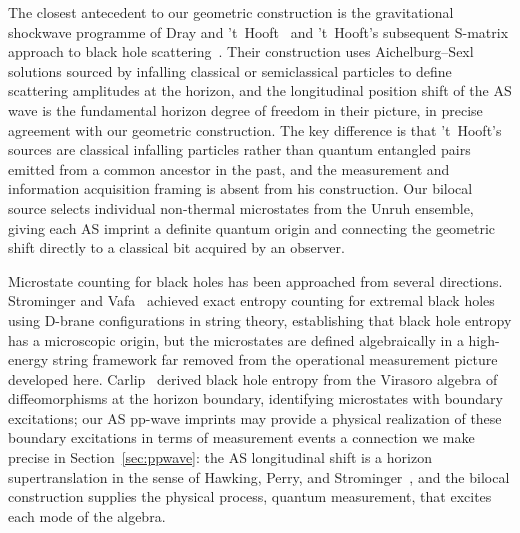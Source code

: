 \documentclass[12pt,a4paper]{article}
\begin{document}

The closest antecedent to our geometric construction is the 
gravitational shockwave programme of Dray and 't~Hooft~\cite{dray1985gravitational} and 't~Hooft's subsequent S-matrix approach to black hole 
scattering~\cite{thooft1996}. %
Their construction uses Aichelburg--Sexl 
solutions sourced by infalling classical or semiclassical particles 
to define scattering amplitudes at the horizon, and the longitudinal 
position shift of the AS wave is the fundamental horizon degree of 
freedom in their picture, in precise agreement with our geometric 
construction. The key difference is that 't~Hooft's sources are 
classical infalling particles rather than quantum entangled pairs 
emitted from a common ancestor in the past, and the measurement and 
information acquisition framing is absent from his construction. Our 
bilocal source selects individual non-thermal microstates from the 
Unruh ensemble, giving each AS imprint a definite quantum origin and 
connecting the geometric shift directly to a classical bit acquired 
by an observer.

Microstate counting for black holes has been approached from several 
directions. Strominger and Vafa~\cite{strominger1996microscopic} achieved 
exact entropy counting for extremal black holes using D-brane 
configurations in string theory, establishing that black hole entropy 
has a microscopic origin, but the microstates are defined 
algebraically in a high-energy string framework far removed from 
the operational measurement picture developed here. Carlip~\cite{carlip1999} 
derived black hole entropy from the Virasoro algebra of 
diffeomorphisms at the horizon boundary, identifying microstates 
with boundary excitations; our AS pp-wave imprints may provide a 
physical realization of these boundary excitations in terms of 
measurement events a connection we make precise in 
Section~\ref{sec:ppwave}: the AS longitudinal shift is a horizon 
supertranslation in the sense of Hawking, Perry, and 
Strominger~\cite{hawking2016soft}, and the bilocal construction 
supplies the physical process, quantum measurement, that 
excites each mode of the algebra.
\end{document}
